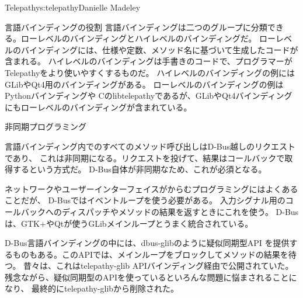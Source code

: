 \begin{aosachapter}{Telepathy}{s:telepathy}{Danielle Madeley}
\begin{aosasect1}{言語バインディングの役割}
言語バインディングは二つのグループに分類できる。ローレベルのバインディングとハイレベルのバインディングだ。
ローレベルのバインディングには、仕様や定数、メソッド名に基づいて生成したコードが含まれる。
ハイレベルのバインディングは手書きのコードで、プログラマーがTelepathyをより使いやすくするものだ。
ハイレベルのバインディングの例にはGLibやQt4用のバインディングがある。
ローレベルのバインディングの例はPythonバインディングや
Cのlibtelepathyであるが、GLibやQt4バインディングにもローレベルのバインディングが含まれている。

\begin{aosasect2}{非同期プログラミング}

言語バインディング内でのすべてのメソッド呼び出しはD-Bus越しのリクエストであり、
これは非同期になる。リクエストを投げて、結果はコールバックで取得するという方式だ。
D-Bus自体が非同期なため、これが必須となる。

ネットワークやユーザーインターフェイスがからむプログラミングにはよくあることだが、
D-Busではイベントループを使う必要がある。
入力シグナル用のコールバックへのディスパッチやメソッドの結果を返すときにこれを使う。
D-Busは、GTK+やQtが使うGLibメインループとうまく統合されている。

D-Bus言語バインディングの中には、dbus-glibのように疑似同期型API
を提供するものもある。このAPIでは、メインループをブロックしてメソッドの結果を待つ。
昔々は、これはtelepathy-glib APIバインディング経由で公開されていた。
残念ながら、疑似同期型のAPIを使っているといろんな問題に悩まされることになり、
最終的にtelepathy-glibから削除された。


\end{aosasect2}
\end{aosasect1}
\end{aosachapter}
